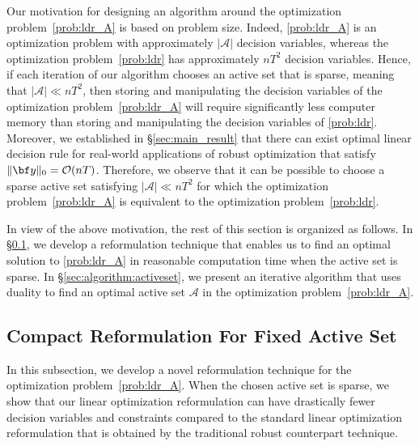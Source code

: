 \documentclass[nonblindrev,mnsc]{informs3} %
\newcommand{\by}{{\bf y}}
\begin{document}
Our motivation for designing an algorithm around the optimization problem~\eqref{prob:ldr_A} is based on problem size. Indeed,  \eqref{prob:ldr_A} is an optimization problem with approximately $| \mathcal{A}|$ decision variables, whereas the optimization problem~\eqref{prob:ldr}  has approximately $nT^2$ decision variables. Hence, if each iteration of our algorithm chooses an active set that is sparse, meaning that $|\mathcal{A}| \ll nT^2$, then  storing and manipulating the decision variables of the optimization problem~\eqref{prob:ldr_A} will require significantly less computer memory than storing and manipulating the decision variables of \eqref{prob:ldr}. Moreover, we established in  \S\ref{sec:main_result} that there can exist  optimal linear decision rule for real-world applications of robust optimization that satisfy $ \| \by \|_0 = \mathcal{O}(nT)$. Therefore,  we observe that it can be possible to choose a sparse active set satisfying $| \mathcal{A}| \ll nT^2$ for which the optimization problem~\eqref{prob:ldr_A} is equivalent to the optimization problem~\eqref{prob:ldr}. 


In view of the above motivation, the rest of this section is organized as follows. In  \S\ref{sec:algorithm:fixed_active_set}, we  develop a  reformulation technique that enables us to find an optimal solution to \eqref{prob:ldr_A} in reasonable computation time  when the active set is sparse.
In \S\ref{sec:algorithm:activeset}, we present 
an iterative algorithm that uses duality to find an optimal  active set $\mathcal{A}$ in the optimization problem~\eqref{prob:ldr_A}. 



\subsection{Compact Reformulation For Fixed Active Set} \label{sec:algorithm:fixed_active_set}
In this subsection, we develop a novel    reformulation technique for the optimization problem~\eqref{prob:ldr_A}. 
When the chosen active set is sparse, we show that our  linear optimization reformulation can  have drastically fewer  decision variables and constraints compared to the standard linear optimization reformulation that is obtained by the  traditional robust counterpart technique.
\end{document}
